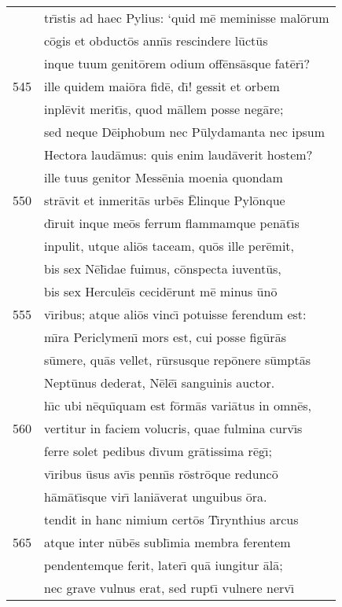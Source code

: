 \documentclass[paper=6in:9in,pagesize=pdftex,
               headinclude=on,footinclude=on,12pt]{scrbook}
\begin{document}
\begin{longtable}[p]{ r l }
 & tr\={\i}stis ad haec Pylius: `quid m\=e meminisse mal\=orum\\ 
 & c\=ogis et obduct\=os ann\={\i}s rescindere l\=uct\=us\\ 
 & inque tuum genit\=orem odium off\=ens\=asque fat\=er\={\i}?\\ 
545 & ille quidem mai\=ora fid\=e, d\={\i}! gessit et orbem\\ 
 & inpl\=evit merit\={\i}s, quod m\=allem posse neg\=are;\\ 
 & sed neque D\=eiphobum nec P\=ulydamanta nec ipsum\\ 
 & Hectora laud\=amus: quis enim laud\=averit hostem?\\ 
 & ille tuus genitor Mess\=enia moenia quondam\\ 
550 & str\=avit et inmerit\=as urb\=es \=Elinque Pyl\=onque\\ 
 & d\={\i}ruit inque me\=os ferrum flammamque pen\=at\={\i}s\\ 
 & inpulit, utque ali\=os taceam, qu\=os ille per\=emit,\\ 
 & bis sex N\=el\={\i}dae fuimus, c\=onspecta iuvent\=us,\\ 
 & bis sex Hercule\={\i}s cecid\=erunt m\=e minus \=un\=o\\ 
555 & v\={\i}ribus; atque ali\=os vinc\={\i} potuisse ferendum est:\\ 
 & m\={\i}ra Periclymen\={\i} mors est, cui posse fig\=ur\=as\\ 
 & s\=umere, qu\=as vellet, r\=ursusque rep\=onere s\=umpt\=as\\ 
 & Nept\=unus dederat, N\=el\=e\={\i} sanguinis auctor.\\ 
 & h\={\i}c ubi n\=equ\={\i}quam est f\=orm\=as vari\=atus in omn\=es,\\ 
560 & vertitur in faciem volucris, quae fulmina curv\={\i}s\\ 
 & ferre solet pedibus d\={\i}vum gr\=atissima r\=eg\={\i};\\ 
 & v\={\i}ribus \=usus av\={\i}s penn\={\i}s r\=ostr\=oque redunc\=o\\ 
 & h\=am\=at\={\i}sque vir\={\i} lani\=averat unguibus \=ora.\\ 
 & tendit in hanc nimium cert\=os T\={\i}rynthius arcus\\ 
565 & atque inter n\=ub\=es subl\={\i}mia membra ferentem\\ 
 & pendentemque ferit, later\={\i} qu\=a iungitur \=al\=a;\\ 
 & nec grave vulnus erat, sed rupt\={\i} vulnere nerv\={\i}\\ 

\end{longtable}
\end{document}
